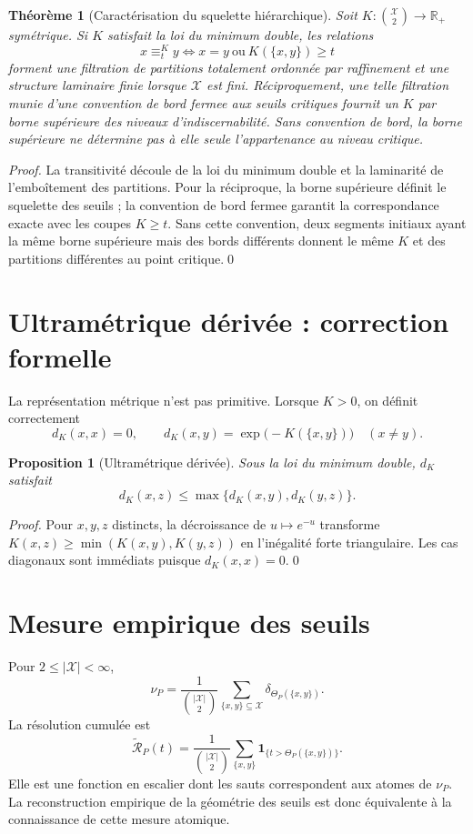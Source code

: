 \documentclass[11pt,a4paper,openany]{book}
\newtheorem{proposition}[definition]{Proposition}
\newtheorem{theorem}[definition]{Théorème}
\newcommand{\X}{\mathcal X}
\begin{document}
\begin{theorem}[Caractérisation du squelette hiérarchique]
Soit \(K:\binom{\mathcal X}{2}\to\mathbb R_+\) symétrique. Si \(K\) satisfait la loi du minimum double, les relations
\[
x\equiv_t^K y\iff x=y\ \text{ou}\ K(\{x,y\})\ge t
\]
forment une filtration de partitions totalement ordonnée par raffinement et une structure laminaire finie lorsque \(\mathcal X\) est fini. Réciproquement, une telle filtration munie d'une convention de bord fermee aux seuils critiques fournit un \(K\) par borne supérieure des niveaux d'indiscernabilité. Sans convention de bord, la borne supérieure ne détermine pas à elle seule l'appartenance au niveau critique.
\end{theorem}
\begin{proof}
La transitivité découle de la loi du minimum double et la laminarité de l'emboîtement des partitions. Pour la réciproque, la borne supérieure définit le squelette des seuils ; la convention de bord fermee garantit la correspondance exacte avec les coupes \(K\ge t\). Sans cette convention, deux segments initiaux ayant la même borne supérieure mais des bords différents donnent le même \(K\) et des partitions différentes au point critique.\qed\end{proof}

\section{Ultramétrique dérivée : correction formelle}
La représentation métrique n'est pas primitive. Lorsque \(K>0\), on définit correctement
\[
d_K(x,x)=0,
\qquad
 d_K(x,y)=\exp\bigl(-K(\{x,y\})\bigr)\quad(x\ne y).
\]
\begin{proposition}[Ultramétrique dérivée]
Sous la loi du minimum double, \(d_K\) satisfait
\[
d_K(x,z)\le\max\{d_K(x,y),d_K(y,z)\}.
\]
\end{proposition}
\begin{proof}
Pour \(x,y,z\) distincts, la décroissance de \(u\mapsto e^{-u}\) transforme
\(K(x,z)\ge\min(K(x,y),K(y,z))\) en l'inégalité forte triangulaire. Les cas diagonaux sont immédiats puisque \(d_K(x,x)=0\).\qed\end{proof}

\section{Mesure empirique des seuils}
Pour \(2\leq |\X|<\infty\),
\[
\nu_P=
\frac{1}{\binom{|\X|}{2}}
\sum_{\{x,y\}\subseteq\X}
\delta_{\Theta_P(\{x,y\})}.
\]
La résolution cumulée est
\[
\widetilde{\mathcal R}_P(t)=
\frac{1}{\binom{|\X|}{2}}
\sum_{\{x,y\}}
\mathbf 1_{\{t>\Theta_P(\{x,y\})\}}.
\]
Elle est une fonction en escalier dont les sauts correspondent aux atomes de \(\nu_P\). La reconstruction empirique de la géométrie des seuils est donc équivalente à la connaissance de cette mesure atomique.
\end{document}
